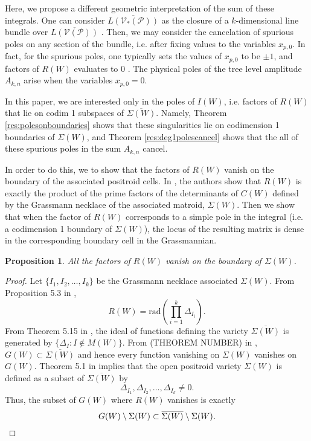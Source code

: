 \documentclass[11pt]{article}
\newcommand{\cP}{\mathcal{P}}
\newcommand{\cV}{\mathcal{V}}
\newcommand{\VP}{\cV(\cP)}
\newcommand{\VPs}{\cV_*(\cP)}
\newtheorem{prop}[thm]{Proposition}
\theoremstyle{remark}
\theoremstyle{definition}
\begin{document}
Here, we propose a different geometric interpretation of the sum of
these integrals. One can consider $\overline{L(\VPs)}$ as the closure of a $k$-dimensional
  line bundle over $\overline{L(\VP)}$ \cite{non-orientable}. Then, we may consider the
cancelation of spurious poles on any section of the bundle, i.e. after fixing values to the variables $x_{p, 0}$. In fact,
for the spurious poles, one typically sets the values of $x_{p,0}$ to
be $\pm 1$, and factors of $R(W)$ evaluates to $0$ \cite{??}. The physical poles of the tree level amplitude $A_{k,n}$ arise when the variables $x_{p, 0} = 0$. 


 In this paper, we are interested only in the poles of $I(W)$, i.e. factors of $R(W)$ that lie on codim 1 subspaces of $\overline{\Sigma(W)}$.  Namely, Theorem \ref{res:polesonboundaries} shows that these singularities lie on codimension 1 boundaries of $\Sigma(W)$, and Theorem \ref{res:deg1polescancel} shows that the all of these spurious poles in the sum  $A_{k,n}$ cancel.

In order to do this, we to show that the factors of $R(W)$ vanish on the boundary of the associated positroid cells. In \cite{generalcombinatoricsII}, the authors show that $R(W)$ is exactly the product of the prime factors of the determinants of $C(W)$ defined by the Grassmann necklace of the associated matroid, $\Sigma(W)$. Then we show that when the factor of $R(W)$ corresponds to a simple pole in the integral (i.e. a codimension 1 boundary of $\Sigma(W)$), the locus of the resulting matrix is dense in the corresponding boundary cell in the Grassmannian.

\begin{prop}
All the factors of $R(W)$ vanish on the boundary of $\Sigma(W)$.
\end{prop}


\begin{proof}
Let $\{I_1, I_2, \dots, I_k\}$ be the Grassmann necklace associated $\Sigma(W)$. From Proposition 5.3 in \cite{generalcombinatoricsII},
%
\begin{displaymath}
R(W) = \mathrm{rad}\left(\prod_{i = 1}^{k} \Delta_{I_i}\right).
\end{displaymath}
%
From Theorem 5.15 in \cite{knutsonlamspeyerjuggling}, the ideal of functions defining the variety $\overline{\Sigma(W)}$ is generated by $\{\Delta_I : I \notin M(W)\}$. From (THEOREM NUMBER) in \cite{basisshapeloci}, $G(W) \subset \overline{\Sigma(W)}$ and hence every function vanishing on $\Sigma(W)$ vanishes on $G(W)$. Theorem 5.1 in \cite{knutsonlamspeyerjuggling} implies that the open positroid variety $\Sigma(W)$ is defined as a subset of $\overline{\Sigma(W)}$ by
%
\begin{displaymath}
\Delta_{I_1}, \Delta_{I_2}, \dots, \Delta_{I_k} \neq 0.
\end{displaymath}
%
Thus, the subset of $G(W)$ where $R(W)$ vanishes is exactly
%
\begin{displaymath}
G(W) \setminus \Sigma(W) \subset \overline{\Sigma(W)} \setminus \Sigma(W). \qedhere
\end{displaymath}
\end{proof}
\end{document}
